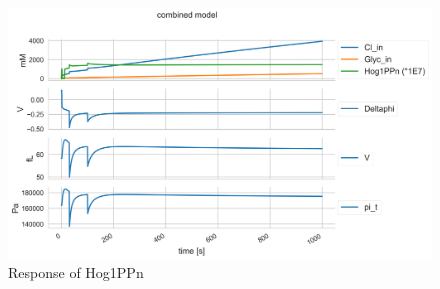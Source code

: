 \begin{figure}[h!]
	\begin{center}
		\begin{minipage}{0,8\textwidth}
			
			\includegraphics[width=\textwidth]{picture/combined_models_71.png}
			\caption{Response of Hog1PPn} 
			\label{SingleDose} 
		\end{minipage}
	\end{center}
\end{figure}


